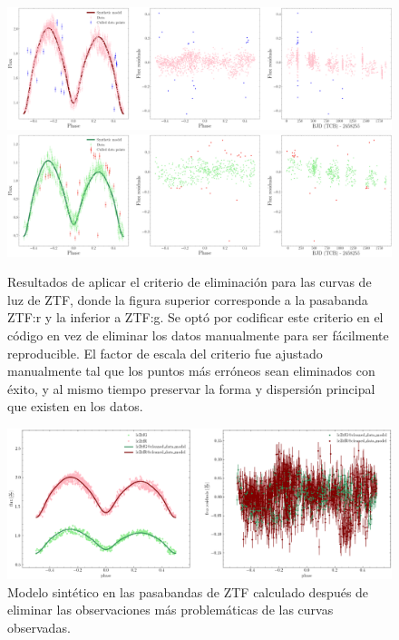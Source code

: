 \begin{figure}[!ht]
	\centering
	\includegraphics[scale=0.24]{Metodologia/Secciones/ModeloComputacional/Figures/Figura Malas Observaciones ZTF:r.png}
	\includegraphics[scale=0.24]{Metodologia/Secciones/ModeloComputacional/Figures/Figura Malas Observaciones ZTF:g.png}
	\caption{Resultados de aplicar el criterio de eliminación para las curvas de
	luz de ZTF, donde la figura superior corresponde a la pasabanda ZTF:r y la
	inferior a ZTF:g. Se optó por codificar este criterio en el código en vez de
	eliminar los datos manualmente para ser fácilmente reproducible. El factor
	de escala del criterio fue ajustado manualmente tal que los puntos más
	erróneos sean eliminados con éxito, y al mismo tiempo preservar la forma y
	dispersión principal que existen en los datos.}
	\label{figuraEliminarMalasObservacionesZtf}
\end{figure}

\begin{figure}[!ht]
	\centering
	\includegraphics[scale=0.44]{Metodologia/Secciones/ModeloComputacional/Figures/Figura Modelo Sin Malas Observaciones ZTF.png}
	\caption{Modelo sintético en las pasabandas de ZTF calculado después de
	eliminar las observaciones más problemáticas de las curvas observadas.}
	\label{figuraModeloSinMalasObservacionesZtf}
\end{figure}

